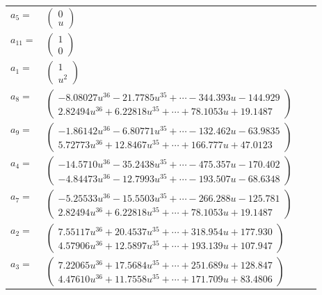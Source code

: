 \documentclass[1p]{elsarticle_modified}
\theoremstyle{definition}
\begin{document}
\begin{tabular}{m{7pt} m{180pt} m{7pt} m{180pt} }
\flushright $a_{5}=$&$\begin{pmatrix}0\\u\end{pmatrix}$ \\
\flushright $a_{11}=$&$\begin{pmatrix}1\\0\end{pmatrix}$ \\
\flushright $a_{1}=$&$\begin{pmatrix}1\\u^2\end{pmatrix}$ \\
\flushright $a_{8}=$&$\begin{pmatrix}-8.08027 u^{36}-21.7785 u^{35}+\cdots-344.393 u-144.929\\2.82494 u^{36}+6.22818 u^{35}+\cdots+78.1053 u+19.1487\end{pmatrix}$ \\
\flushright $a_{9}=$&$\begin{pmatrix}-1.86142 u^{36}-6.80771 u^{35}+\cdots-132.462 u-63.9835\\5.72773 u^{36}+12.8467 u^{35}+\cdots+166.777 u+47.0123\end{pmatrix}$ \\
\flushright $a_{4}=$&$\begin{pmatrix}-14.5710 u^{36}-35.2438 u^{35}+\cdots-475.357 u-170.402\\-4.84473 u^{36}-12.7993 u^{35}+\cdots-193.507 u-68.6348\end{pmatrix}$ \\
\flushright $a_{7}=$&$\begin{pmatrix}-5.25533 u^{36}-15.5503 u^{35}+\cdots-266.288 u-125.781\\2.82494 u^{36}+6.22818 u^{35}+\cdots+78.1053 u+19.1487\end{pmatrix}$ \\
\flushright $a_{2}=$&$\begin{pmatrix}7.55117 u^{36}+20.4537 u^{35}+\cdots+318.954 u+177.930\\4.57906 u^{36}+12.5897 u^{35}+\cdots+193.139 u+107.947\end{pmatrix}$ \\
\flushright $a_{3}=$&$\begin{pmatrix}7.22065 u^{36}+17.5684 u^{35}+\cdots+251.689 u+128.847\\4.47610 u^{36}+11.7558 u^{35}+\cdots+171.709 u+83.4806\end{pmatrix}$ \\

\end{tabular}
\end{document}
